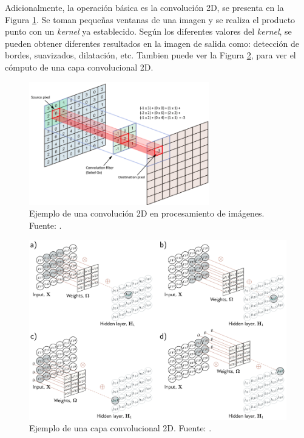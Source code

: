 Adicionalmente, la operación básica es la convolución 2D, se presenta en la Figura \ref{fig:cnn}. Se toman pequeñas ventanas de una imagen y se realiza el producto punto con un \textit{kernel} ya establecido. Según los diferentes valores del \textit{kernel}, se pueden obtener diferentes resultados en la imagen de salida como: detección de bordes, suavizados, dilatación, etc. Tambien puede ver la Figura \ref{fig:conv2d}, para ver el cómputo de una capa convolucional 2D.


\begin{figure}[H]
	\centering
	\includegraphics[width=0.7\textwidth]{../img/neoantigen/cnn}
	\caption{Ejemplo de una convolución 2D en procesamiento de imágenes. Fuente: \cite{Shuchen2022}.}
	\label{fig:cnn}
\end{figure}

\begin{figure}[h]
	\centering
	\includegraphics[width=\textwidth]{../img/theory/conv2d}
	\caption{Ejemplo de una capa convolucional 2D. Fuente: \cite{prince2023understanding}.}
	\label{fig:conv2d}
\end{figure}

